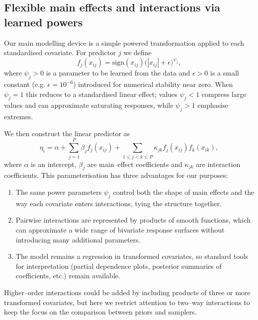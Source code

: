 \documentclass[11pt]{article}
\begin{document}
\begin{doublespacing}
\begin{linenumbers}
\begin{flushleft}
\subsection{Flexible main effects and interactions via learned powers}

Our main modelling device is a simple powered transformation applied to each standardised covariate. For predictor $j$ we define
\begin{equation}
  f_j(x_{ij}) = \mathrm{sign}(x_{ij})\bigl(|x_{ij}| + \epsilon\bigr)^{\psi_j},
  \label{eq:power-transform}
\end{equation}
where $\psi_j > 0$ is a parameter to be learned from the data and $\epsilon>0$ is a small constant (e.g. $\epsilon = 10^{-6}$) introduced for numerical stability near zero. When $\psi_j = 1$ this reduces to a standardised linear effect; values $\psi_j < 1$ compress large values and can approximate saturating responses, while $\psi_j > 1$ emphasise extremes.

We then construct the linear predictor as
\begin{equation}
  \eta_i
  =
  \alpha
  + \sum_{j=1}^P \beta_j f_j(x_{ij})
  + \sum_{1 \le j < k \le P} \kappa_{jk} f_j(x_{ij}) f_k(x_{ik}),
  \label{eq:eta}
\end{equation}
where $\alpha$ is an intercept, $\beta_j$ are main–effect coefficients and $\kappa_{jk}$ are interaction coefficients. This parameterisation has three advantages for our purposes:

\begin{enumerate}
  \item The same power parameters $\psi_j$ control both the shape of main effects and the way each covariate enters interactions, tying the structure together.
  \item Pairwise interactions are represented by products of smooth functions, which can approximate a wide range of bivariate response surfaces without introducing many additional parameters.
  \item The model remains a regression in transformed covariates, so standard tools for interpretation (partial dependence plots, posterior summaries of coefficients, etc.) remain available.
\end{enumerate}

Higher–order interactions could be added by including products of three or more transformed covariates, but here we restrict attention to two–way interactions to keep the focus on the comparison between priors and samplers.


\end{flushleft}
\end{linenumbers}
\end{doublespacing}
\end{document}

